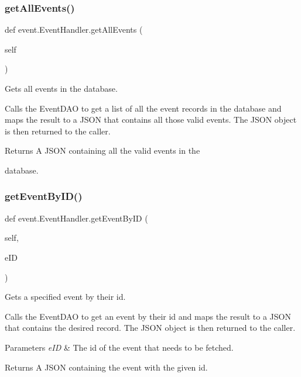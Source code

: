 \subsubsection{\texorpdfstring{get\+All\+Events()}{getAllEvents()}}
{\footnotesize\ttfamily def event.\+Event\+Handler.\+get\+All\+Events (\begin{DoxyParamCaption}\item[{}]{self }\end{DoxyParamCaption})}



Gets all events in the database. 

Calls the Event\+D\+AO to get a list of all the event records in the database and maps the result to a J\+S\+ON that contains all those valid events. The J\+S\+ON object is then returned to the caller.

\begin{DoxyReturn}{Returns}
A J\+S\+ON containing all the valid events in the 

database. 
\end{DoxyReturn}
\mbox{\label{classevent_1_1_event_handler_afcbd5bd749281372de788e6a47f3360a}} 
\subsubsection{\texorpdfstring{get\+Event\+By\+I\+D()}{getEventByID()}}
{\footnotesize\ttfamily def event.\+Event\+Handler.\+get\+Event\+By\+ID (\begin{DoxyParamCaption}\item[{}]{self,  }\item[{}]{e\+ID }\end{DoxyParamCaption})}



Gets a specified event by their id. 

Calls the Event\+D\+AO to get an event by their id and maps the result to a J\+S\+ON that contains the desired record. The J\+S\+ON object is then returned to the caller.


\begin{DoxyParams}{Parameters}
{\em e\+ID} & The id of the event that needs to be fetched.\\
\hline
\end{DoxyParams}
\begin{DoxyReturn}{Returns}
A J\+S\+ON containing the event with the given id. 
\end{DoxyReturn}
\mbox{\label{classevent_1_1_event_handler_a1f830364d1554c07f41ace64fe543328}} 
